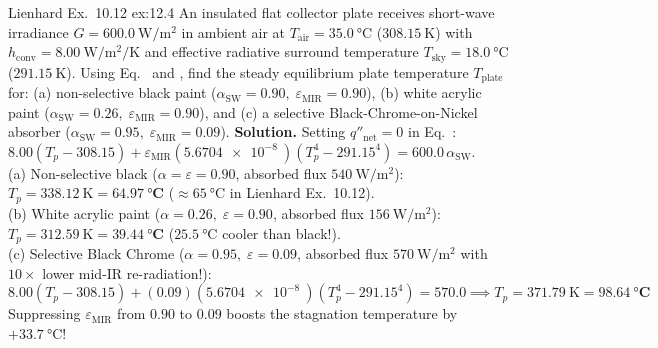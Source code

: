 \begin{workedexample}{Lienhard Ex.\ 10.12 }{ex:12.4}
An insulated flat collector plate receives short-wave irradiance $G = \SI{600.0}{\watt\per\square\meter}$ in ambient air at $T_{\mathrm{air}} = \SI{35.0}{\celsius}$ ($\SI{308.15}{\kelvin}$) with $h_{\mathrm{conv}} = \SI{8.00}{\watt\per\square\meter\per\kelvin}$ and effective radiative surround temperature $T_{\mathrm{sky}} = \SI{18.0}{\celsius}$ ($\SI{291.15}{\kelvin}$). Using Eq.~ and , find the steady equilibrium plate temperature $T_{\mathrm{plate}}$ for: (a) non-selective black paint ($\alpha_{\mathrm{SW}} = 0.90,\; \varepsilon_{\mathrm{MIR}} = 0.90$), (b) white acrylic paint ($\alpha_{\mathrm{SW}} = 0.26,\; \varepsilon_{\mathrm{MIR}} = 0.90$), and (c) a selective Black-Chrome-on-Nickel absorber ($\alpha_{\mathrm{SW}} = 0.95,\; \varepsilon_{\mathrm{MIR}} = 0.09$).
\tcblower
\textbf{Solution.} Setting $q''_{\mathrm{net}} = 0$ in Eq.~: $8.00(T_p - 308.15) + \varepsilon_{\mathrm{MIR}}(\SI{5.6704e-8}{})(T_p^4 - 291.15^4) = 600.0\,\alpha_{\mathrm{SW}}$.\\
(a) Non-selective black ($\alpha=\varepsilon=0.90$, absorbed flux $\SI{540}{\watt\per\square\meter}$): $T_p = \SI{338.12}{\kelvin} = \mathbf{\SI{64.97}{\celsius}}$ ($\approx\SI{65}{\celsius}$ in Lienhard Ex.~10.12).\\
(b) White acrylic paint ($\alpha=0.26,\; \varepsilon=0.90$, absorbed flux $\SI{156}{\watt\per\square\meter}$): $T_p = \SI{312.59}{\kelvin} = \mathbf{\SI{39.44}{\celsius}}$ ($\SI{25.5}{\celsius}$ cooler than black!).\\
(c) Selective Black Chrome ($\alpha=0.95,\; \varepsilon=0.09$, absorbed flux $\SI{570}{\watt\per\square\meter}$ with $10\times$ lower mid-IR re-radiation!):
\[
  8.00(T_p - 308.15) + (0.09)(\SI{5.6704e-8}{})(T_p^4 - 291.15^4) = 570.0 \implies T_p = \SI{371.79}{\kelvin} = \mathbf{\SI{98.64}{\celsius}}
\]
Suppressing $\varepsilon_{\mathrm{MIR}}$ from $0.90$ to $0.09$ boosts the stagnation temperature by $+\SI{33.7}{\celsius}$!
\end{workedexample}

